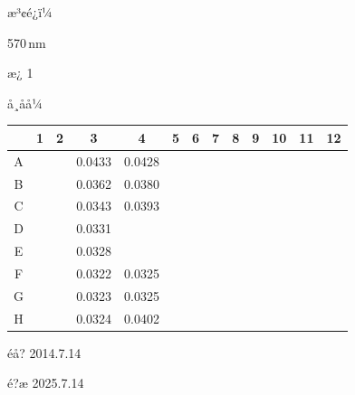 \documentclass[UTF8,10pt,a4paper,fontset=fandol]{ctexart}
\newcommand{\fieldvalue}[1]{#1}
\newcommand{\handwritten}[1]{#1}
\begin{document}

\medskip
\noindent æ³¢é¿ï¼

\fieldvalue{570\,nm}

\noindent æ¿ 1

\noindent å¸åå¼

\begin{center}
\scriptsize
\begin{tabular}{c|*{12}{c}}
 & 1 & 2 & 3 & 4 & 5 & 6 & 7 & 8 & 9 & 10 & 11 & 12\\ \hline
A & & & 0.0433 & 0.0428 & \text{---} & \text{---} & \text{---} & \text{---} & \text{---} & \text{---} & \text{---} & \\ \hline
B & & & 0.0362 & 0.0380 & \text{---} & \text{---} & \text{---} & \text{---} & \text{---} & \text{---} & \text{---} & \\ \hline
C & & & 0.0343 & 0.0393 & \text{---} & \text{---} & \text{---} & \text{---} & \text{---} & \text{---} & \text{---} & \\ \hline
D & & & 0.0331 & \text{---} & \text{---} & \text{---} & \text{---} & \text{---} & \text{---} & \text{---} & \text{---} & \\ \hline
E & & & 0.0328 & \text{---} & \text{---} & \text{---} & \text{---} & \text{---} & \text{---} & \text{---} & \text{---} & \\ \hline
F & & & 0.0322 & 0.0325 & \text{---} & \text{---} & \text{---} & \text{---} & \text{---} & \text{---} & \text{---} & \\ \hline
G & & & 0.0323 & 0.0325 & \text{---} & \text{---} & \text{---} & \text{---} & \text{---} & \text{---} & \text{---} & \\ \hline
H & & & 0.0324 & 0.0402 & \text{---} & \text{---} & \text{---} & \text{---} & \text{---} & \text{---} & \text{---} &
\end{tabular}
\end{center}


\handwritten{é­å? 2014.7.14}

\handwritten{é?æ 2025.7.14}
\end{document}
